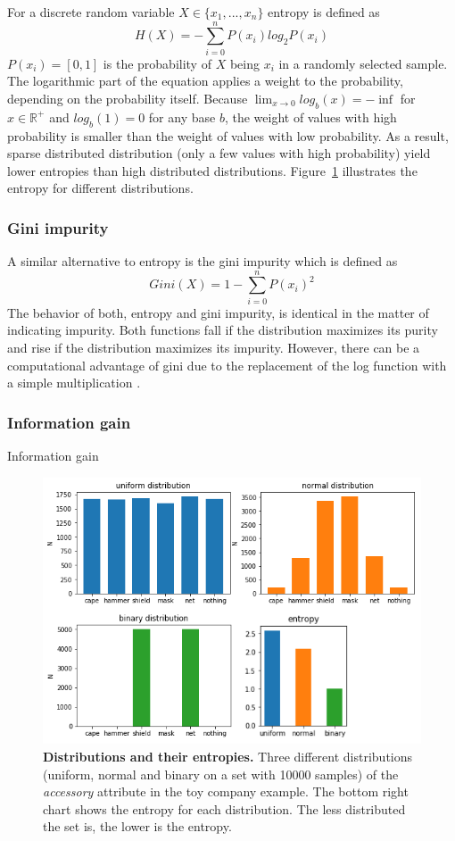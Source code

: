 \documentclass[a4paper]{report}
\begin{document}
    For a discrete random variable $X \in \{x_1, ..., x_n\}$ entropy is defined as \[H(X)=-\sum_{i=0}^{n}P(x_i)log_2P(x_i)\]
    $P(x_i)=[0, 1]$ is the probability of $X$ being $x_i$ in a randomly selected sample. The logarithmic part of the equation applies a weight to the probability, depending on the probability itself. Because $\lim_{x \to 0}log_b(x)=-\inf$ for $x\in\mathbb{R}^+$ and $log_b(1)=0$ for any base $b$, the weight of values with high probability is smaller than the weight of values with low probability. As a result, sparse distributed distribution (only a few values with high probability) yield lower entropies than high distributed distributions. Figure~\ref{fig:entropy} illustrates the entropy for different distributions.
    
    \subsubsection{Gini impurity}
    A similar alternative to entropy is the gini impurity which is defined as $$Gini(X)=1-\sum_{i=0}^{n}P(x_i)^2$$
    The behavior of both, entropy and gini impurity, is identical in the matter of indicating impurity. Both functions fall if the distribution maximizes its purity and rise if the distribution maximizes its impurity. However, there can be a computational advantage of gini due to the replacement of the log function with a simple multiplication \cite{log-complexity}.
    
    \subsubsection{Information gain}
    Information gain 
    
    \begin{figure}
    \centering
    \includegraphics[width=\textwidth]{entropy}
    \caption{\textbf{Distributions and their entropies.} Three different distributions (uniform, normal and binary on a set with 10000 samples) of the \textit{accessory} attribute in the toy company example. The bottom right chart shows the entropy for each distribution. The less distributed the set is, the lower is the entropy. }
    \label{fig:entropy}
    \end{figure}
    
\end{document}
